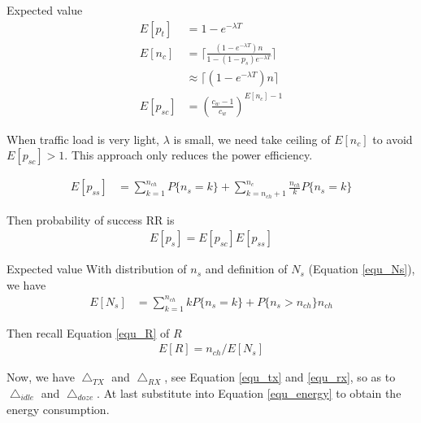 \documentclass[10pt]{beamer}
\begin{document}
\begin{frame}{Expected value}
\begin{align}
E[p_t] &= 1-e^{-\lambda T} \\
E[n_c] &= \lceil \frac{(1-e^{-\lambda T})n}{1-(1-p_s)e^{-\lambda T}}  \rceil \\
		&\approx \lceil (1-e^{-\lambda T})n \rceil\\
E[p_{sc}] &=  (\frac{c_w-1}{c_w})^{E[n_c]-1}
\end{align}

When traffic load is very light, $\lambda$ is small, we need take ceiling of $E[n_c]$ to avoid $E[p_{sc}]>1$.
This approach only reduces the power efficiency.

\begin{align}
E[p_{ss}] &= \sum^{n_{ch}}_{k=1}P\lbrace n_s = k \rbrace 
	+  \sum_{k=n_{ch}+1}^{n_c}\frac{n_{ch}}{k}P\lbrace n_s = k \rbrace
\end{align}

Then probability of success RR is 
\begin{align}
E[p_{s}] = E[p_{sc}]E[p_{ss}]
\end{align}
\end{frame}

\begin{frame}{Expected value}
With distribution of $n_s$ and definition of $N_s$  (Equation \ref{equ_Ns}), we have 
\begin{align}
E[N_s] &= \sum_{k=1}^{n_{ch}}kP\lbrace n_s =k \rbrace  + P\lbrace n_s > n_{ch} \rbrace n_{ch}  
\end{align}

Then recall Equation \ref{equ_R} of $R$
\begin{align}
E[R] = n_{ch}/E[N_s]
\end{align}

Now, we have $\bigtriangleup_{TX}$ and $\bigtriangleup_{RX}$, see Equation \ref{equ_tx} and \ref{equ_rx}, so as to $\bigtriangleup_{idle}$ and $\bigtriangleup_{doze}$. 
At last substitute into Equation \ref{equ_energy} to obtain the energy consumption.
\end{frame}
\end{document}
